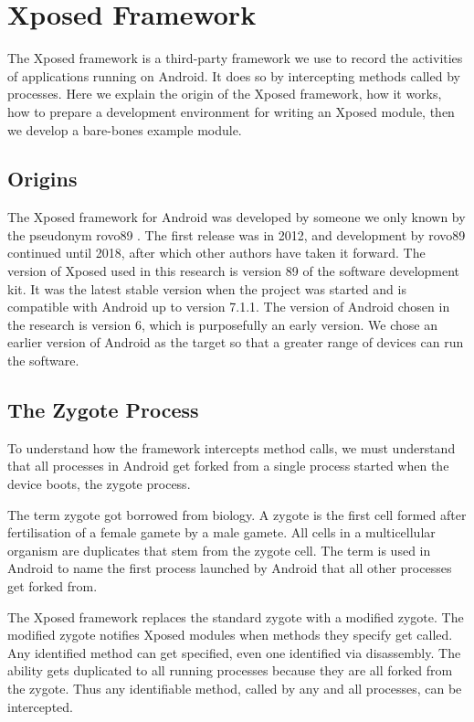 \chapter{Xposed Framework}
\label{chap:Xposed Framework}

The Xposed framework is a third-party framework we use to record the activities of applications running on Android.  It does so by intercepting methods called by processes.  Here we explain the origin of the Xposed framework, how it works, how to prepare a development environment for writing an Xposed module, then we develop a bare-bones example module.

\section{Origins}
\label{sec:Origins}

The Xposed framework for Android was developed by someone we only known by the pseudonym rovo89 \cite{rovo89}.  The first release was in 2012, and development by rovo89 continued until 2018, after which other authors have taken it forward.  The version of Xposed used in this research is version 89 of the software development kit.  It was the latest stable version when the project was started and is compatible with Android up to version 7.1.1.  The version of Android chosen in the research is version 6, which is purposefully an early version.  We chose an earlier version of Android as the target so that a greater range of devices can run the software.

\section{The Zygote Process}
\label{sec:The Zygote Process}

To understand how the framework intercepts method calls, we must understand that all processes in Android get forked from a single process started when the device boots, the zygote process.

The term zygote got borrowed from biology.  A zygote is the first cell formed after fertilisation of a female gamete by a male gamete.  All cells in a multicellular organism are duplicates that stem from the zygote cell.  The term is used in Android to name the first process launched by Android that all other processes get forked from.

The Xposed framework replaces the standard zygote with a modified zygote.  The modified zygote notifies Xposed modules when methods they specify get called.  Any identified method can get specified, even one identified via disassembly.  The ability gets duplicated to all running processes because they are all forked from the zygote.  Thus any identifiable method, called by any and all processes, can be intercepted.

